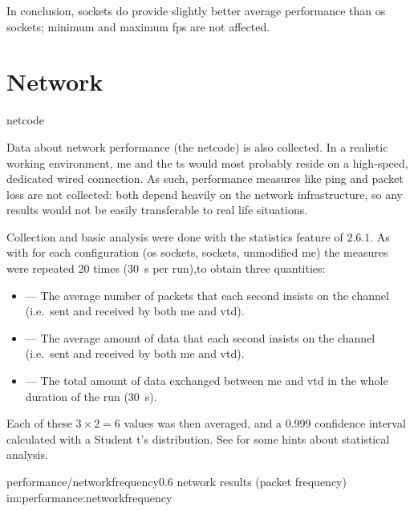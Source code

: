 In conclusion,  sockets do provide slightly better average performance than \gls{os} sockets; minimum and maximum \gls{fps} are not affected.

\section{Network}\label{sc:performance:network}

\begin{definition}{netcode}
\end{definition}



Data about network performance (the \gls{netcode}) is also collected. In a realistic working environment, \gls{me} and the \gls{ts} would most probably reside on a high-speed, dedicated wired connection. As such, performance measures like ping and packet loss are not collected: both depend heavily on the network infrastructure, so any results would not be easily transferable to real life situations.

Collection and basic analysis were done with the statistics feature of  $2.6.1$. As with  for each configuration (\gls{os} sockets,  sockets, unmodified \gls{me}) the measures were repeated \num{20} times (\SI{30}{\second} per run),to obtain three quantities:

\begin{itemize}
	\item {} --- The average number of packets that each second insists on the channel (i.e.\ sent and received by both \gls{me} and \gls{vtd}).
	\item {} --- The average amount of data that each second insists on the channel (i.e.\ sent and received by both \gls{me} and \gls{vtd}).
	\item {} --- The total amount of data exchanged between \gls{me} and \gls{vtd} in the whole duration of the run (\SI{30}{\second}).
\end{itemize}

\FLOATnoindent Each of these $3\times2=6$ values was then averaged, and a \num{0,999} confidence interval calculated with a Student t's distribution. See  for some hints about statistical analysis.

\begin{image}
	{performance/networkfrequency}{0.6}
	{network results (packet frequency)}
	{im:performance:networkfrequency}
	{}
\end{image}

